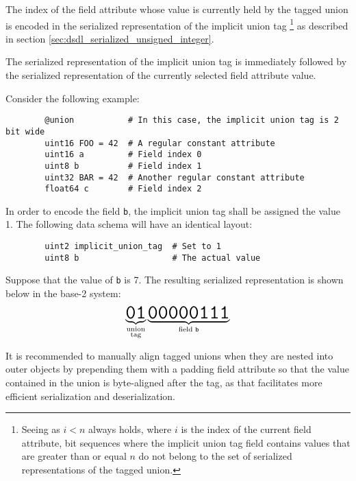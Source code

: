The index of the field attribute whose value is currently held by the tagged union is encoded
in the serialized representation of the implicit union tag%
\footnote{%
    Seeing as $i < n$ always holds, where $i$ is the index of the current field attribute,
    bit sequences where the implicit union tag field contains values
    that are greater than or equal $n$ do not belong to the set of serialized representations of the tagged union.
}
as described in section \ref{sec:dsdl_serialized_unsigned_integer}.

The serialized representation of the implicit union tag is immediately followed by
the serialized representation of the currently selected field attribute value.

\begin{remark}
    Consider the following example:

    \begin{verbatim}
        @union           # In this case, the implicit union tag is 2 bit wide
        uint16 FOO = 42  # A regular constant attribute
        uint16 a         # Field index 0
        uint8 b          # Field index 1
        uint32 BAR = 42  # Another regular constant attribute
        float64 c        # Field index 2
    \end{verbatim}

    In order to encode the field \verb|b|, the implicit union tag shall be assigned the value 1.
    The following data schema will have an identical layout:

    \begin{verbatim}
        uint2 implicit_union_tag  # Set to 1
        uint8 b                   # The actual value
    \end{verbatim}

    Suppose that the value of \verb|b| is 7.
    The resulting serialized representation is shown below in the base-2 system:
    $$%
    \underbrace{\hugett{01}}_{\substack{\text{union} \\ \text{tag}}}%
    \underbrace{\hugett{00000111}}_{\text{field }\texttt{b}}%
    $$

    It is recommended to manually align tagged unions when they are nested into outer objects by
    prepending them with a padding field attribute so that the value contained in the union is byte-aligned
    after the tag, as that facilitates more efficient serialization and deserialization.
\end{remark}

